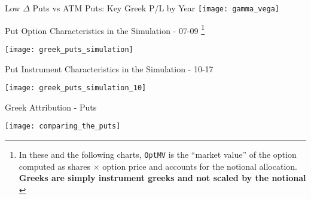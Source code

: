 \documentclass{beamer}
\begin{document}
\begin{frame}{Low $\Delta$ Puts vs ATM Puts: Key Greek P/L by Year}
\texttt{[image: gamma\_vega]}
\end{frame}


\begin{frame}{Put Option Characteristics in the Simulation - 07-09 \footnote{In these and the following charts, {\tt OptMV} is the ``market value'' of the option computed as shares $\times$ option price and accounts for the notional allocation. {\bf Greeks are simply instrument greeks and not scaled by the notional } }}

\texttt{[image: greek\_puts\_simulation]}

\end{frame}

\begin{frame}{Put Instrument Characteristics in the Simulation - 10-17}

\texttt{[image: greek\_puts\_simulation\_10]}

\end{frame}



\begin{frame}{Greek Attribution - Puts}

\texttt{[image: comparing\_the\_puts]}

\end{frame}
\end{document}
